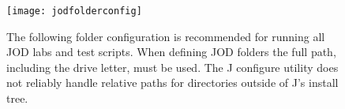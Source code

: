  \begin{figure}[htbp]
  \centering
  \texttt{[image: jodfolderconfig]}
  \caption[JOD Folders]{The following folder configuration is recommended for running all JOD labs and test scripts.  When defining JOD folders the full path, including the drive letter, must be used.  The J configure utility does not reliably handle relative paths for directories outside of J's install tree. }
   \label{eps:jodfolders}
   \end{figure}
